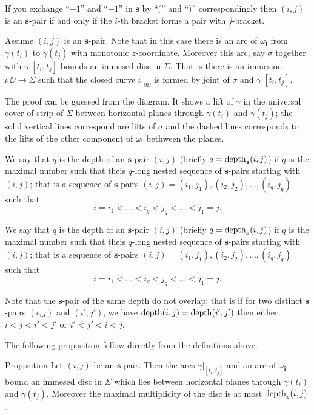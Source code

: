 \documentclass[a4paper,10pt]{amsart}
\begin{document}
If you exchange ``$+1$'' and ``$-1$'' in $\bm{s}$ by ``$($'' and ``$)$'' correspondingly then $(i,j)$ is an $\bm{s}$-pair
if and only if the $i$-th bracket forms a pair with $j$-bracket.

Assume $(i,j)$ is an $\bm{s}$-pair.
Note that in this case there is an arc of $\omega_{\bm{i}}$
from $\gamma(t_i)$ to $\gamma(t_j)$
with monotonic $z$-coordinate.
Moreover this arc, say $\sigma$ together with $\gamma|{[t_i,t_j]}$ bounds an immesed disc in $\Sigma$.
That is there is an immesion $\iota\:\DD\to\Sigma$ 
such that the closed curve $\iota|_{\partial \DD}$ is formed by joint of $\sigma$ and $\gamma|{[t_i,t_j]}$.

The proof can be guessed from the diagram.
It shows a lift of $\gamma$ in the universal cover of strip of $\Sigma$ between horizontal planes through $\gamma(t_i)$ and $\gamma(t_j)$;
the solid vertical lines correspond are lifts of $\sigma$ and the dashed lines corresponds to the lifts of the other component of $\omega_{\bm{i}}$ bethween the planes.

We say that $q$ is the depth of an $\bm{s}$-pair $(i,j)$
(briefly $q=\mathop{\rm depth}\nolimits_{\bm{s}}(i,j)$) 
if $q$ is the maximal number such that theis $q$-long nested sequence of $\bm{s}$-pairs starting with $(i,j)$; 
that is a sequence of $\bm{s}$-pairs
$(i,j)=(i_1,j_1),(i_2,j_2),\dots,(i_q,j_q)$ such that
\[i=i_1<\dots<i_q<j_q<\dots<j_1=j.\]

We say that $q$ is the depth of an $\bm{s}$-pair $(i,j)$
(briefly $q=\mathop{\rm depth}\nolimits_{\bm{s}}(i,j)$) 
if $q$ is the maximal number such that theis $q$-long nested sequence of $\bm{s}$-pairs starting with $(i,j)$; 
that is a sequence of $\bm{s}$-pairs
$(i,j)=(i_1,j_1),(i_2,j_2),\dots,(i_q,j_q)$ such that
\[i=i_1<\dots<i_q<j_q<\dots<j_1=j.\]

Note that the $\bm{s}$-pair of the same depth do not overlap;
that is if for two distinct $\bm{s}$-pairs $(i,j)$ and $(i',j')$,
we have $\mathop{\rm depth}\nolimits(i,j)=\mathop{\rm depth}\nolimits(i',j')$
then either $i<j<i'<j'$ or $i'<j'<i<j$.

The following proposition follow directly from the definitions above.

\begin{thm}{Proposition}\label{prop:immersion}
Let $(i,j)$ be an $\bm{s}$-pair.
Then the arcs $\gamma|_{[t_i,t_j]}$ and an arc of $\omega_{\bm{i}}$ bound an immesed disc in $\Sigma$ which lies between horizontal planes through $\gamma(t_i)$ and $\gamma(t_j)$.
Moreover the maximal multiplicity of the disc is at most $\mathop{\rm depth}\nolimits_{\bm{s}}(i,j)$.
\end{thm}
\end{document}
